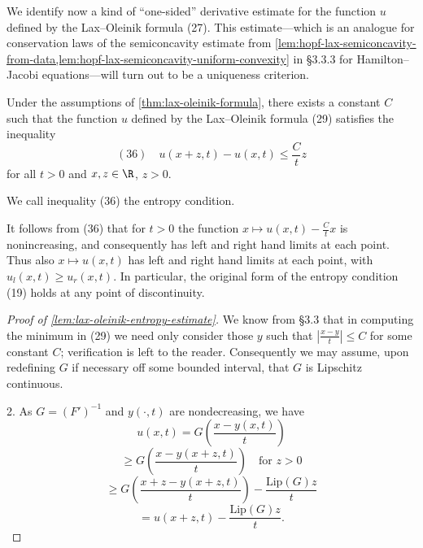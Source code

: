 We identify now a kind of ``one-sided'' derivative estimate for the function $u$ defined by the Lax--Oleinik formula (27). This estimate---which is an analogue for conservation laws of the semiconcavity estimate from \cref{lem:hopf-lax-semiconcavity-from-data,lem:hopf-lax-semiconcavity-uniform-convexity} in \S 3.3.3 for Hamilton--Jacobi equations---will turn out to be a uniqueness criterion.

\begin{lemma}
\label{lem:lax-oleinik-entropy-estimate}
Under the assumptions of \cref{thm:lax-oleinik-formula}, there exists a constant $C$ such that the function $u$ defined by the Lax--Oleinik formula (29) satisfies the inequality
$$(36) \quad u(x+z,t) - u(x,t) \leq \frac{C}{t}z$$
for all $t > 0$ and $x, z \in \R$, $z > 0$.
\end{lemma}

\begin{definition}
\label{def:entropy-condition-inequality}
We call inequality (36) the entropy condition.
\end{definition}

\begin{remark}
\label{rem:entropy-condition-consequences}
It follows from (36) that for $t > 0$ the function $x \mapsto u(x,t) - \frac{C}{t}x$ is nonincreasing, and consequently has left and right hand limits at each point. Thus also $x \mapsto u(x,t)$ has left and right hand limits at each point, with $u_l(x,t) \geq u_r(x,t)$. In particular, the original form of the entropy condition (19) holds at any point of discontinuity.
\end{remark}

\begin{proof}[Proof of \cref{lem:lax-oleinik-entropy-estimate}]
We know from \S 3.3 that in computing the minimum in (29) we need only consider those $y$ such that $|\frac{x-y}{t}| \leq C$ for some constant $C$; verification is left to the reader. Consequently we may assume, upon redefining $G$ if necessary off some bounded interval, that $G$ is Lipschitz continuous.

2. As $G = (F')^{-1}$ and $y(\cdot,t)$ are nondecreasing, we have
$$u(x,t) = G\left(\frac{x-y(x,t)}{t}\right)$$
$$\geq G\left(\frac{x-y(x+z,t)}{t}\right) \quad \text{for } z > 0$$
$$\geq G\left(\frac{x+z-y(x+z,t)}{t}\right) - \frac{\text{Lip}(G)z}{t}$$
$$= u(x+z,t) - \frac{\text{Lip}(G)z}{t}.$$
\end{proof}

